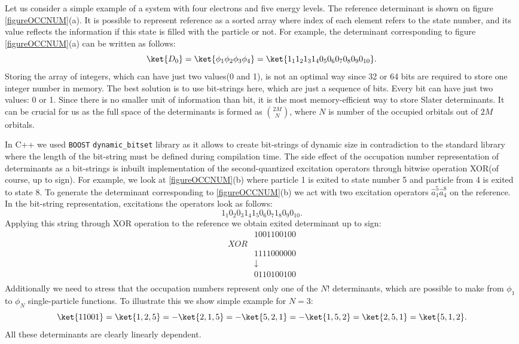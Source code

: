 \documentclass[twoside,english]{uiofysmaster}
\newcommand{\classname}[1]{\texttt{#1}}
\begin{document}
Let us consider a simple example of a system with four electrons and five energy levels. The reference determinant is shown on figure \ref{figureOCCNUM}(a). It is possible to represent reference as a sorted array where index of each element refers to the state number, and its value reflects the information if this state is filled with the particle or not.
For example, the determinant corresponding to figure \ref{figureOCCNUM}(a) can be written as follows:
\[
\ket{D_0} = \ket{\phi_1 \phi_2 \phi_3 \phi_4} = \ket{1_1 1_2 1_3 1_4 0_5 0_6 0_7 0_8 0_9 0_{10} }.
\]
Storing the array of integers, which can have just two values(0 and 1), is not an optimal way since 32 or 64 bits are required to store one integer number in memory. The best solution is to use bit-strings here, which are just a sequence of bits. Every bit can have just two values: 0 or 1.
Since there is no smaller unit of information than bit, it is the most memory-efficient way to store Slater determinants. It can be crucial for us as the full space of the determinants is formed as $\binom {2M}{N}$, where $N$ is number of the occupied orbitals out of $2M$ orbitals.

In C++ we used \classname{BOOST} \classname{dynamic_bitset} library as it allows to create bit-strings of dynamic size in contradiction to the standard library where the length of the bit-string must be defined during compilation time.
The side effect of the occupation number representation of determinants as a bit-strings is inbuilt implementation of the second-quantized excitation operators through bitwise operation XOR(of course, up to sign). For example, we look at \ref{figureOCCNUM}(b) where particle 1 is exited to state number 5 and particle from 4 is exited to state 8. To generate the determinant corresponding to \ref{figureOCCNUM}(b) we act with two excitation operators $\hat{a}_1^5 \hat{a}_4^8$ on the reference. In the bit-string representation, excitations the operators look as follows:
\[
1_1 0_2 0_3 1_4 1_5 0_6 0_7 1_8 0_9 0_{10}.
\]
Applying this string through XOR operation to the reference we obtain exited determinant up to sign:
\[
\begin{matrix} 
	&1001100100 \\
	XOR& \\
	&1111000000\\
	&\downarrow \\
	&0110100100\\
\end{matrix}
\]
Additionally we need to stress that the occupation numbers represent only one of the $N!$ determinants, which are possible to make from $\phi_1$ to $\phi_N$ single-particle functions. To illustrate this we show simple example for $N=3$:
\[
\ket{11001} = \ket{1,2,5} = -\ket{2,1,5} = -\ket{5,2,1} = -\ket{1,5,2} = \ket{2,5,1} = \ket{5,1,2}.
\]
All these determinants are clearly linearly dependent.
\end{document}

